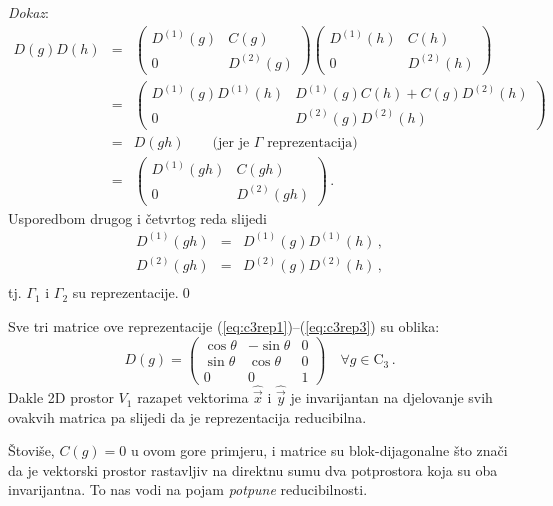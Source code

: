 \emph{Dokaz}:
\begin{eqnarray*}
D(g)D(h)&=&
\begin{pmatrix}
 D^{(1)}(g) & C(g) \\ 0 & D^{(2)}(g)
\end{pmatrix}
\begin{pmatrix}
 D^{(1)}(h) & C(h) \\ 0 & D^{(2)}(h)
\end{pmatrix}  \\[1ex]
&=&
\begin{pmatrix}
  D^{(1)}(g)D^{(1)}(h) &  D^{(1)}(g)C(h)+C(g)D^{(2)}(h) \\
       0               &   D^{(2)}(g)D^{(2)}(h)  
   \end{pmatrix}  \\[1ex]
&=& D(gh) \qquad \textrm{(jer je $\Gamma$ reprezentacija)}  \\[1ex]
&=& 
\begin{pmatrix}
 D^{(1)}(gh) & C(gh) \\ 0 & D^{(2)}(gh)
\end{pmatrix} \,.
\end{eqnarray*}
Usporedbom drugog i četvrtog reda slijedi
\begin{eqnarray*}
D^{(1)}(gh) &=& D^{(1)}(g)D^{(1)}(h) \,, \\
D^{(2)}(gh) &=& D^{(2)}(g)D^{(2)}(h) \,, \\
\end{eqnarray*}
tj. $\Gamma_1$ i $\Gamma_2$ su reprezentacije.\qed

\begin{primjer}
Sve tri matrice ove reprezentacije (\ref{eq:c3rep1})--(\ref{eq:c3rep3}) su oblika:
\begin{displaymath}
 D(g)= 
\begin{pmatrix}
 \cos\theta & -\sin\theta & 0 \\
 \sin\theta& \cos\theta & 0 \\
    0 & 0 & 1 
\end{pmatrix}
\quad \forall g \in \textrm{C}_3 \,.
\end{displaymath}
Dakle 2D prostor $V_1$ razapet vektorima $\hat{\vec{x}}$ i $\hat{\vec{y}}$
je invarijantan  na djelovanje svih ovakvih matrica
pa slijedi da je reprezentacija reducibilna.
\end{primjer}

Štoviše, $C(g)=0$ u ovom gore primjeru, i matrice su
blok-dijagonalne što znači da je vektorski prostor
rastavljiv na direktnu sumu dva potprostora koja su oba
invarijantna. To nas vodi na pojam \emph{potpune} reducibilnosti.


